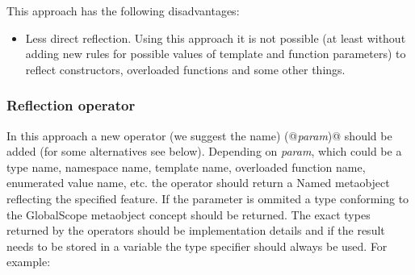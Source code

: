 This approach has the following disadvantages:

\begin{itemize}
	\item Less direct reflection. Using this approach it is not possible
	(at least without adding new rules for possible values of template
	and function parameters) to reflect constructors, overloaded functions
	and some other things.
\end{itemize}

\subsubsection{Reflection operator}

In this approach a new operator (we suggest the name) \verb@reflect(@{\em param}\verb@)@
should be added (for some alternatives see below).
Depending on {\em param}, which could be a type name, namespace name,
template name, overloaded function name, enumerated value name, etc. the operator should
return a {\metaobject Named} metaobject reflecting the specified feature.
If the parameter is ommited a type conforming to the {\metaobject GlobalScope} metaobject
concept should be returned.
The exact types returned by the operators should be implementation details and if the
result needs to be stored in a variable the \verb@auto@ type specifier should always
be used.
For example:

